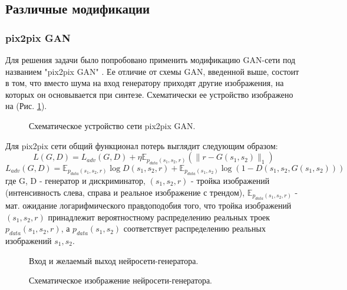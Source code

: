 	\subsection{Различные модификации}
		\subsubsection{pix2pix GAN}
			Для решения задачи было попробовано применить модификацию GAN-сети под названием "pix2pix GAN" \cite{p2p}. Ее отличие от схемы GAN, введенной выше, состоит в том, что вместо шума на вход генератору приходят другие изображения, на которых он основывается при синтезе. Схематически ее устройство изображено на (Рис. \ref{p2p}).
			\begin{figure}
				\centering{\texttt{[image: p2p]}}
				\caption{Схематическое устройство сети pix2pix GAN.}
				\label{p2p}
			\end{figure}
			Для pix2pix сети общий функционал потерь выглядит следующим образом: $$ L(G, D) = L_{adv}(G, D) + \eta \mathbb{E}_{p_{data}(s_1, s_2, r)} (\parallel r - G(s_1, s_2) \parallel_1)$$
			$$ L_{adv}(G, D) = \mathbb{E}_{p_{data}(s_1, s_2, r)}\log D(s_1, s_2, r) +  \mathbb{E}_{p_{data}(s_1, s_2)} \log (1 - D(s_1, s_2, G(s_1, s_2)))$$
			где G, D - генератор и дискриминатор, $(s_1, s_2, r)$ - тройка изображений (интенсивность слева, справа и реальное изображение с трендом),  $\mathbb{E}_{p_{data}(s_1, s_2, r)}$ - мат. ожидание логарифмического правдоподобия того, что тройка изображений $(s_1, s_2, r)$ принадлежит вероятностному распределению реальных троек $p_{data}(s_1, s_2, r)$, а $p_{data}(s_1, s_2)$ соответствует распределению реальных изображений $s_1, s_2$.
			\begin{figure}
				\caption{Вход и желаемый выход нейросети-генератора.}
				\label{p2p-gen}
			\end{figure}
			\begin{figure}
				\caption{Схематическое изображение нейросети-генератора.}
				\label{unet-sheme}
			\end{figure}
